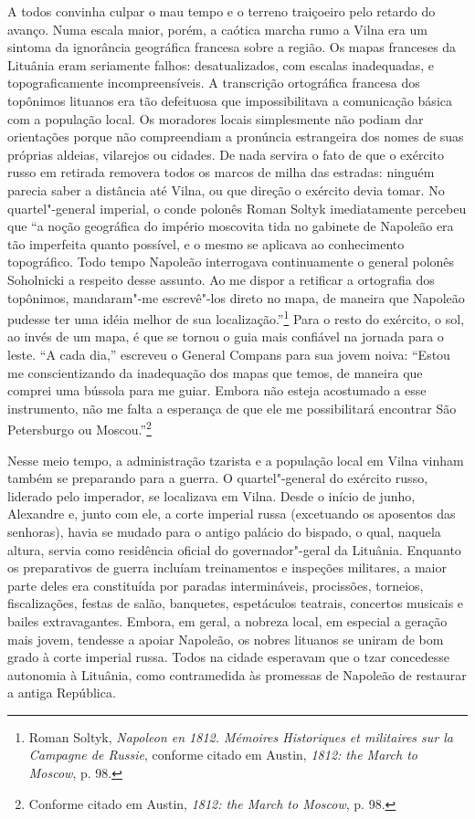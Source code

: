 A todos convinha culpar o mau tempo e o terreno traiçoeiro pelo retardo
do avanço. Numa escala maior, porém, a caótica marcha rumo a Vilna era
um sintoma da ignorância geográfica francesa sobre a região. Os mapas
franceses da Lituânia eram seriamente falhos: desatualizados, com
escalas inadequadas, e topograficamente incompreensíveis. A transcrição
ortográfica francesa dos topônimos lituanos era tão defeituosa que
impossibilitava a comunicação básica com a população local. Os moradores
locais simplesmente não podiam dar orientações porque não compreendiam a
pronúncia estrangeira dos nomes de suas próprias aldeias, vilarejos ou
cidades. De nada servira o fato de que o exército russo em retirada
removera todos os marcos de milha das estradas: ninguém parecia saber a
distância até Vilna, ou que direção o exército devia tomar. No
quartel"-general imperial, o conde polonês Roman Soltyk imediatamente
percebeu que ``a noção geográfica do império moscovita tida no gabinete
de Napoleão era tão imperfeita quanto possível, e o mesmo se aplicava ao
conhecimento topográfico. Todo tempo Napoleão interrogava continuamente
o general polonês Soholnicki a respeito desse assunto. Ao me dispor a
retificar a ortografia dos topônimos, mandaram"-me escrevê"-los direto no
mapa, de maneira que Napoleão pudesse ter uma idéia melhor de sua
localização.''\footnote{Roman Soltyk, \emph{Napoleon en 1812. Mémoires
  Historiques et militaires sur la Campagne de Russie}, conforme citado
  em Austin, \emph{1812: the March to Moscow}, p. 98.} Para o resto do
exército, o sol, ao invés de um mapa, é que se tornou o guia mais
confiável na jornada para o leste. ``A cada dia,'' escreveu o General
Compans para sua jovem noiva: ``Estou me conscientizando da inadequação
dos mapas que temos, de maneira que comprei uma bússola para me guiar.
Embora não esteja acostumado a esse instrumento, não me falta a
esperança de que ele me possibilitará encontrar São Petersburgo ou
Moscou.''\footnote{Conforme citado em Austin, \emph{1812: the March to
  Moscow}, p. 98.}

Nesse meio tempo, a administração tzarista e a população local em Vilna
vinham também se preparando para a guerra. O quartel"-general do exército
russo, liderado pelo imperador, se localizava em Vilna. Desde o início
de junho, Alexandre e, junto com ele, a corte imperial russa (excetuando
os aposentos das senhoras), havia se mudado para o antigo palácio do
bispado, o qual, naquela altura, servia como residência oficial do
governador"-geral da Lituânia. Enquanto os preparativos de guerra
incluíam treinamentos e inspeções militares, a maior parte deles era
constituída por paradas intermináveis, procissões, torneios,
fiscalizações, festas de salão, banquetes, espetáculos teatrais,
concertos musicais e bailes extravagantes. Embora, em geral, a nobreza
local, em especial a geração mais jovem, tendesse a apoiar Napoleão, os
nobres lituanos se uniram de bom grado à corte imperial russa. Todos na
cidade esperavam que o tzar concedesse autonomia à Lituânia, como
contramedida às promessas de Napoleão de restaurar a antiga República.

